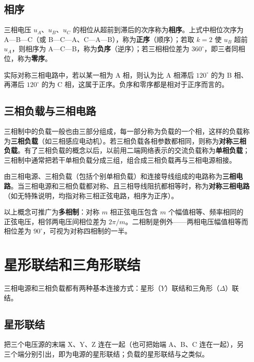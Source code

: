 \subsection{相序}
三相电压 $u_A$、$u_B$、$u_C$ 的相位从超前到滞后的次序称为\textbf{相序}。上式中相位次序为 A—B—C（或 B—C—A、C—A—B），称为\textbf{正序}（顺序）；若取 $k=2$ 使 $u_B$ 超前 $u_A$，则相序为 A—C—B，称为\textbf{负序}（逆序）；若三相相位差为 $360^\circ$，即三者同相位，称为\textbf{零序}。

实际对称三相电路中，若以某一相为 A 相，则认为比 A 相滞后 $120^\circ$ 的为 B 相、再滞后 $120^\circ$ 的为 C 相，这属于正序。负序和零序都是相对于正序而言的。

\subsection{三相负载与三相电路}
三相制中的负载一般也由三部分组成，每一部分称为负载的一个相，这样的负载称为\textbf{三相负载}（如三相感应电动机）。若三相负载各相参数都相同，则称为\textbf{对称三相负载}。有了三相负载的概念以后，以前用二端网络表示的交流负载称为\textbf{单相负载}；三相制中通常把若干单相负载分成三组，组合成三相负载再与三相电源相接。

由三相电源、三相负载（包括个别单相负载）和连接导线组成的电路称为\textbf{三相电路}。当三相电源和三相负载都对称、且三相导线阻抗都相等时，称为\textbf{对称三相电路}（如无特殊说明，均指对称三相正弦电路，相序为正序）。

以上概念可推广为\textbf{多相制}：对称 $m$ 相正弦电压包含 $m$ 个幅值相等、频率相同的正弦电压，相邻两电压间相位差为 $2\pi/m$。二相制是例外——两相电压幅值相等而相位差为 $90^\circ$，可视为对称四相制的一半。


\section{星形联结和三角形联结}
三相电源和三相负载都有两种基本连接方式：星形（$Y$）联结和三角形（$\Delta$）联结。

\subsection{星形联结}
把三个电压源的末端 X、Y、Z 连在一起（也可把始端 A、B、C 连在一起），另三个端分别引出，即为电源的星形联结；负载的星形联结与之类似。

